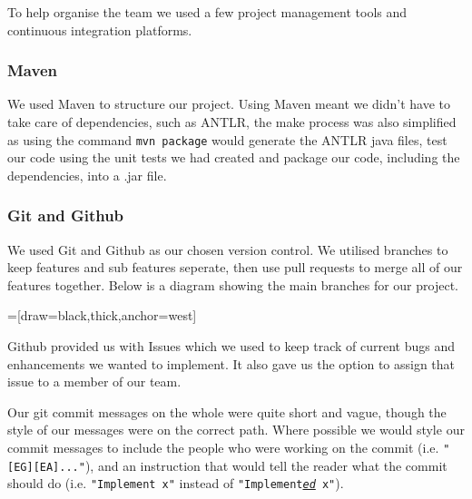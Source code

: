 \documentclass[11pt,a4paper]{article}
\begin{document}
To help organise the team we used a few project management tools and continuous integration platforms.

\subsubsection{Maven}
\label{subs:Maven}

We used Maven to structure our project. Using Maven meant we didn't have to take care of dependencies, such as ANTLR, the make process was also simplified as using the command \texttt{mvn package} would generate the ANTLR java files, test our code using the unit tests we had created and package our code, including the dependencies, into a .jar file.


\subsubsection{Git and Github}
\label{subs:Git and Github}

We used Git and Github as our chosen version control. We utilised branches to keep features and sub features seperate, then use pull requests to merge all of our features together. Below is a diagram showing the main branches for our project.

=[draw=black,thick,anchor=west]

Github provided us with Issues which we used to keep track of current bugs and enhancements we wanted to implement. It also gave us the option to assign that issue to a member of our team.

Our git commit messages on the whole were quite short and vague, though the style of our messages were on the correct path. Where possible we would style our commit messages to include the people who were working on the commit (i.e. \texttt{"[EG][EA]..."}), and an instruction that would tell the reader what the commit should do (i.e. \texttt{"Implement x"} instead of \texttt{"Implement\underline{\textit{ed}} x"}).
\end{document}
